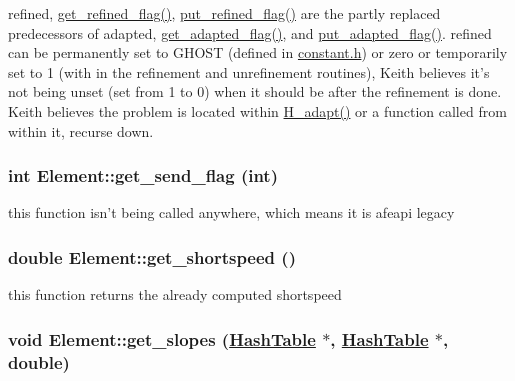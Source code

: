 refined, \hyperlink{classElement_a33}{get\_\-refined\_\-flag()}, \hyperlink{classElement_a36}{put\_\-refined\_\-flag()} are the partly replaced predecessors of adapted, \hyperlink{classElement_a34}{get\_\-adapted\_\-flag()}, and \hyperlink{classElement_a37}{put\_\-adapted\_\-flag()}. refined can be permanently set to GHOST (defined in \hyperlink{constant_8h}{constant.h}) or zero or temporarily set to 1 (with in the refinement and unrefinement routines), Keith believes it's not being unset (set from 1 to 0) when it should be after the refinement is done. Keith believes the problem is located within \hyperlink{hadpt_8C_a12}{H\_\-adapt()} or a function called from within it, recurse down. 

\hypertarget{classElement_a40}{
\subsubsection[get\_\-send\_\-flag]{\setlength{\rightskip}{0pt plus 5cm}int Element::get\_\-send\_\-flag (int)}}
\label{classElement_a40}


this function isn't being called anywhere, which means it is afeapi legacy 

\hypertarget{classElement_a82}{
\subsubsection[get\_\-shortspeed]{\setlength{\rightskip}{0pt plus 5cm}double Element::get\_\-shortspeed ()}}
\label{classElement_a82}


this function returns the already computed shortspeed 

\hypertarget{classElement_a71}{
\subsubsection[get\_\-slopes]{\setlength{\rightskip}{0pt plus 5cm}void Element::get\_\-slopes (\hyperlink{classHashTable}{Hash\-Table} $\ast$, \hyperlink{classHashTable}{Hash\-Table} $\ast$, double)}}
\label{classElement_a71}



